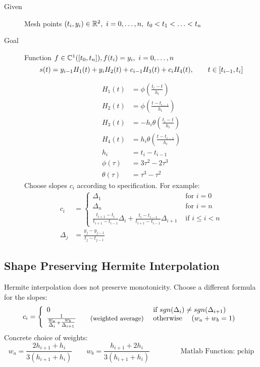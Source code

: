 	\begin{description}
	 \item[Given] Mesh points $(t_i,y_i)\in \mathbb{R}^2,\ i = 0,\ldots,n,\ t_0 < t_1 < \ldots < t_n$
	 \item[Goal] Function $f\in \mathbb{C}^1([t_0,t_n]), f(t_i) =y_i,\ i=0,\ldots, n$
	 \[
	  	  s(t) = y_{i-1}H_1(t) + y_i H_2(t) +c_{i-1} H_3(t) + c_iH_4(t),\qquad t\in[t_{i-1},t_i]\\
	 \]

	 \begin{align*}
	  H_1(t) &= \phi\left(\frac{t_i -t }{h_i}\right)\\
  	  H_2(t) &= \phi\left(\frac{t -t_{i-1}}{h_i}\right)\\
	  H_3(t) &= -h_i\theta\left(\frac{t_i -t }{h_i}\right)\\
	  H_4(t) &= h_i\theta\left(\frac{t -t_{i-1}}{h_i}\right)\\
	  h_i &= t_i - t_{i-1}\\
	  \phi(\tau) &= 3 \tau^2 - 2 \tau^3\\
	  \theta(\tau) &= \tau^3 - \tau^2
	 \end{align*}	
	 Choose slopes $c_i$ according to specification. For example:
	 \begin{align*}
	  c_i &= \left\{ \begin{array}{ll}
	                 \Delta_1 &\text{ for }i=0\\
	                 \Delta_n &\text{ for }i=n\\
	                 \frac{t_{i+1}-t_i}{t_{i+1}-t_{i-1}}\Delta_i + \frac{t_i - t_{i-1}}{t_{i+1}-t_{i-1}}\Delta_{i+1} &\text{ if }i\leq i < n
	                \end{array}
	                \right. \\
			\Delta_j &= \frac{y_j - y_{j-1}}{t_{j}-t_{j-1}}
	 \end{align*}
	\end{description}
	
	\subsection{Shape Preserving Hermite Interpolation}
		Hermite interpolation does not preserve monotonicity. Choose a different formula for the slopes:
		\[
		 c_i = \left\{ \begin{array}{ll}
		                0 & \text{ if } sgn(\Delta_i) \neq sgn(\Delta_{i+1})\\
		                \frac{1}{\tfrac{w_a}{\Delta_i}+\tfrac{w_b}{\Delta_{i+1}}} \qquad  \text{{\small(weighted average)}}&\text{ otherwise }\quad (w_a+w_b=1)
		               \end{array}  \right.
		\]
		Concrete choice of weights:
		\[
		 w_a = \frac{2h_{i+1}+h_i}{3(h_{i+1}+h_i)} \qquad w_b = \frac{h_{i+1}+2h_i}{3(h_{i+1}+h_i)} \qquad \qquad \text{ Matlab Function: pchip}
		\]

